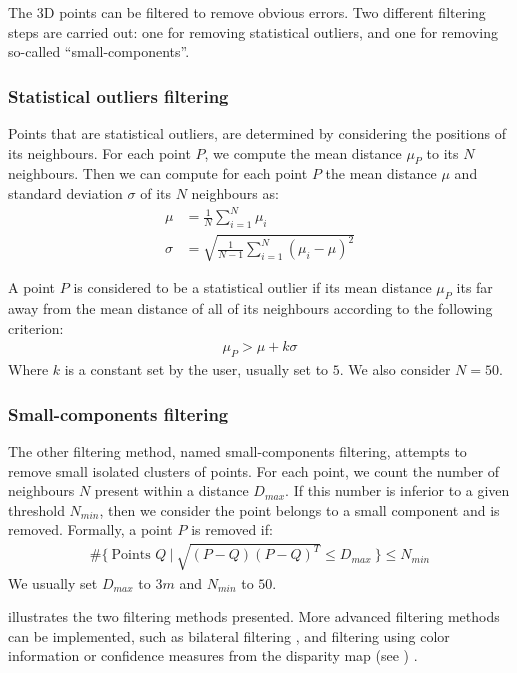 The 3D points can be filtered to remove obvious errors. Two different filtering steps are carried out: one for removing statistical outliers, and one for removing so-called ``small-components''. 
\subsubsection{Statistical outliers filtering}
Points that are statistical outliers, are determined by considering the positions of its neighbours. For each point $P$, we compute the mean distance $\mu_P$ to its $N$ neighbours. Then we can compute for each point $P$ the mean distance $\mu$ and standard deviation $\sigma$ of its $N$ neighbours as:
\begin{align}
    \mu &= \frac{1}{N}\sum_{i=1}^N\mu_i\\
    \sigma &= \sqrt{\frac{1}{N-1}\sum_{i=1}^N(\mu_i-\mu)^2}
\end{align}

A point $P$ is considered to be a statistical outlier if its mean distance $\mu_P$ its far away from the mean distance of all of its neighbours according to the following criterion:
\begin{align}
    \mu_P>\mu+k\sigma
\end{align}
Where $k$ is a constant set by the user, usually set to $5$. We also consider $N=50$.

\subsubsection{Small-components filtering}
The other filtering method, named small-components filtering, attempts to remove small isolated clusters of points. For each point, we count the number of neighbours $N$ present within a distance $D_{max}$. If this number is inferior to a given threshold $N_{min}$, then we consider the point belongs to a small component and is removed. Formally, a point $P$ is removed if:
\begin{align}
    \#\{~\text{Points } Q~|~\sqrt{(P-Q)(P-Q)^T}\leqslant D_{max}~\}\leqslant N_{min}
\end{align}
We usually set $D_{max}$ to $3m$ and $N_{min}$ to $50$.

 illustrates the two filtering methods presented. More advanced filtering methods can be implemented, such as bilateral filtering \cite{digne_bilateral_2017}, and filtering using color information or confidence measures from the disparity map (see ) \cite{youssefi_geometrically_2024}.

